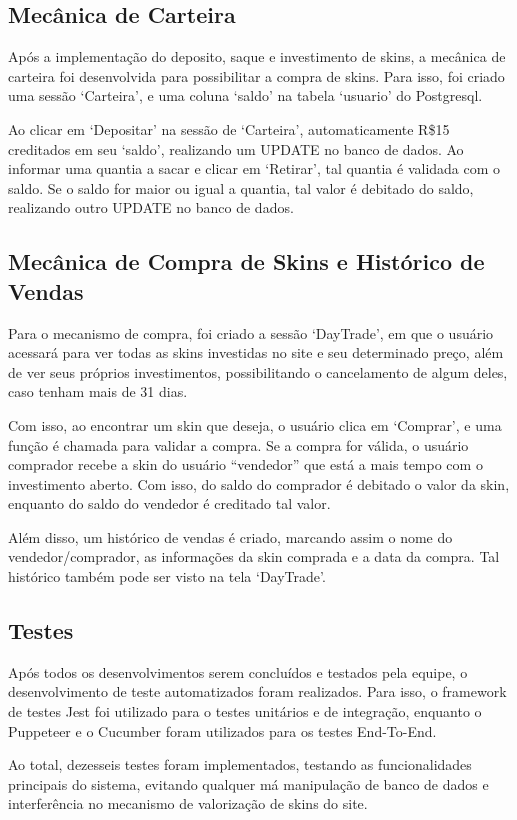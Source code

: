 \subsection{Mecânica de Carteira}
Após a implementação do deposito, saque e investimento de skins, a mecânica de carteira foi 
desenvolvida para possibilitar a compra de skins. Para isso, foi criado uma sessão ‘Carteira’, e 
uma coluna ‘saldo’ na tabela ‘usuario’ do Postgresql. 

Ao clicar em ‘Depositar’ na sessão de ‘Carteira’, automaticamente R\$15 creditados em seu ‘saldo’, 
realizando um UPDATE no banco de dados. Ao informar uma quantia a sacar e clicar em ‘Retirar’, tal 
quantia é validada com o saldo. Se o saldo for maior ou igual a quantia, tal valor é debitado do 
saldo, realizando outro UPDATE no banco de dados.

\subsection{Mecânica de Compra de Skins e Histórico de Vendas}
Para o mecanismo de compra, foi criado a sessão ‘DayTrade’, em que o usuário 
acessará para ver todas as skins investidas no site e seu determinado preço, além 
de ver seus próprios investimentos, possibilitando o cancelamento de algum deles, 
caso tenham mais de 31 dias.

Com isso, ao encontrar um skin que deseja, o usuário clica em ‘Comprar’, e uma função é 
chamada para validar a compra. Se a compra for válida, o usuário comprador recebe a skin 
do usuário “vendedor” que está a mais tempo com o investimento aberto. Com isso, do saldo do 
comprador é debitado o valor da skin, enquanto do saldo do vendedor é creditado tal valor. 

Além disso, um histórico de vendas é criado, marcando assim o nome do vendedor/comprador, as 
informações da skin comprada e a data da compra. Tal histórico também pode ser visto na tela 
‘DayTrade’.

\subsection{Testes}
Após todos os desenvolvimentos serem concluídos e testados pela equipe, o desenvolvimento de 
teste automatizados foram realizados. Para isso, o framework de testes Jest foi utilizado para 
o testes unitários e de integração, enquanto o Puppeteer e o Cucumber foram utilizados para os 
testes End-To-End. 

Ao total, dezesseis testes foram implementados, testando as funcionalidades principais do sistema, 
evitando qualquer má manipulação de banco de dados e interferência no mecanismo de valorização de
skins do site.

